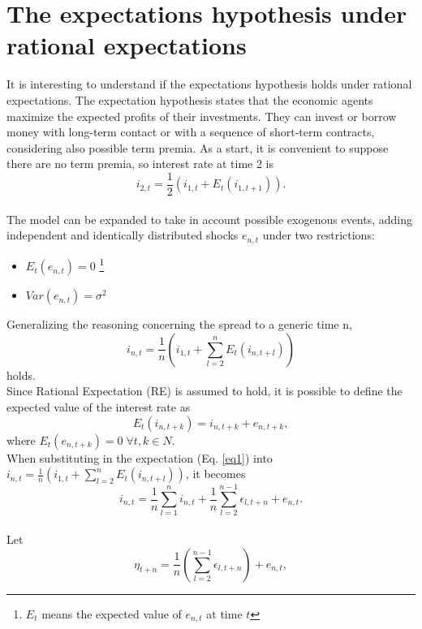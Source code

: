 \documentclass[12pt]{article}
\begin{document}
\section{The expectations hypothesis under rational expectations} \label{sec:3}
It is interesting to understand if the expectations hypothesis holds under rational expectations. The expectation hypothesis states that the economic agents maximize the expected profits of their investments. They can invest or borrow money with long-term contact or with a sequence of short-term contracts, considering also possible term premia.
As a start, it is convenient to suppose there are no term premia, so interest rate at time 2 is 
\begin{equation}
i_{2,t} = \frac{1}{2}(i_{1,t}+E_t(i_{1,t+1})).
\end{equation}
\\The model can be expanded to take in account possible exogenous events, adding independent and identically distributed shocks $e_{n,t}$ under two restrictions:
\begin{itemize}
\item $E_t(e_{n,t})  = 0$ \footnote{$E_t$ means the expected value of $ e_{n,t} $ at time $t$}
\item $Var(e_{n,t})= \sigma^2$
\end{itemize}
Generalizing the reasoning concerning the spread to a generic time n,
\begin{equation}
i_{n,t} = \frac{1}{n}(i_{1,t} + \sum_{l=2}^nE_t(i_{n,t+l}))
\end{equation} holds.
\\Since Rational Expectation (RE) is assumed to hold, it is possible to define the expected value of the interest rate as
\begin{equation} \label{eq1}
E_t(i_{n,t+k})= i_{n,t+k} + e_{n,t+k},
\end{equation} where $E_t( e_{n,t+k}) = 0 \; \forall t,k \in N$.
\\When substituting in the expectation (Eq. \ref{eq1}) into
$i_{n,t} = \frac{1}{n}(i_{1,t} + \sum_{l=2}^nE_t(i_{n,t+l}))$, it becomes
\begin{equation}
i_{n,t} = \frac{1}{n} \sum_{l=1}^{n}i_{n,t} + \frac{1}{n}\sum_{l=2}^{n-1}\epsilon_{l,t+n} + e_{n,t}.
\end{equation}
\\Let 
\begin{equation}
\eta_{t+n} = \frac{1}{n}(\sum_{l=2}^{n-1}\epsilon_{l,t+n}) + e_{n,t},
\end{equation}
\end{document}
